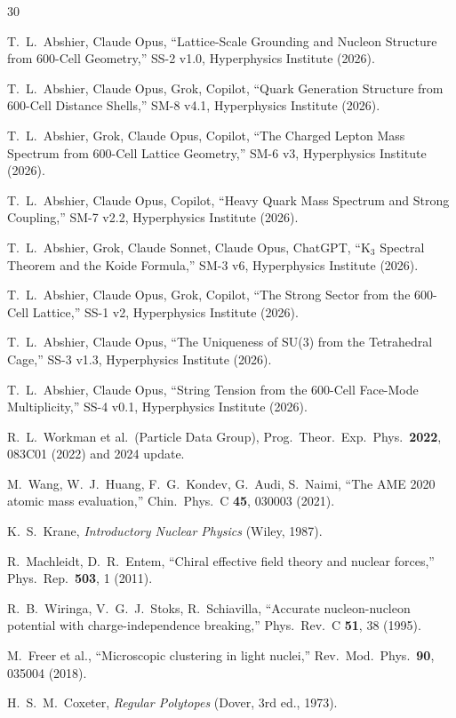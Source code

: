 \documentclass[11pt,letterpaper]{article}
\begin{document}
\begin{thebibliography}{30}

T.~L.~Abshier, Claude Opus, ``Lattice-Scale Grounding and Nucleon Structure from 600-Cell Geometry,'' SS-2 v1.0, Hyperphysics Institute (2026).

T.~L.~Abshier, Claude Opus, Grok, Copilot, ``Quark Generation Structure from 600-Cell Distance Shells,'' SM-8 v4.1, Hyperphysics Institute (2026).

T.~L.~Abshier, Grok, Claude Opus, Copilot, ``The Charged Lepton Mass Spectrum from 600-Cell Lattice Geometry,'' SM-6 v3, Hyperphysics Institute (2026).

T.~L.~Abshier, Claude Opus, Copilot, ``Heavy Quark Mass Spectrum and Strong Coupling,'' SM-7 v2.2, Hyperphysics Institute (2026).

T.~L.~Abshier, Grok, Claude Sonnet, Claude Opus, ChatGPT, ``K$_3$ Spectral Theorem and the Koide Formula,'' SM-3 v6, Hyperphysics Institute (2026).

T.~L.~Abshier, Claude Opus, Grok, Copilot, ``The Strong Sector from the 600-Cell Lattice,'' SS-1 v2, Hyperphysics Institute (2026).

T.~L.~Abshier, Claude Opus, ``The Uniqueness of SU(3) from the Tetrahedral Cage,'' SS-3 v1.3, Hyperphysics Institute (2026).

T.~L.~Abshier, Claude Opus, ``String Tension from the 600-Cell Face-Mode Multiplicity,'' SS-4 v0.1, Hyperphysics Institute (2026).

R.~L.~Workman et al.\ (Particle Data Group), Prog.\ Theor.\ Exp.\ Phys.\ \textbf{2022}, 083C01 (2022) and 2024 update.

M.~Wang, W.~J.~Huang, F.~G.~Kondev, G.~Audi, S.~Naimi, ``The AME 2020 atomic mass evaluation,'' Chin.\ Phys.\ C \textbf{45}, 030003 (2021).

K.~S.~Krane, \emph{Introductory Nuclear Physics} (Wiley, 1987).

R.~Machleidt, D.~R.~Entem, ``Chiral effective field theory and nuclear forces,'' Phys.\ Rep.\ \textbf{503}, 1 (2011).

R.~B.~Wiringa, V.~G.~J.~Stoks, R.~Schiavilla, ``Accurate nucleon-nucleon potential with charge-independence breaking,'' Phys.\ Rev.\ C \textbf{51}, 38 (1995).

M.~Freer et al., ``Microscopic clustering in light nuclei,'' Rev.\ Mod.\ Phys.\ \textbf{90}, 035004 (2018).

H.~S.~M.~Coxeter, \emph{Regular Polytopes} (Dover, 3rd ed., 1973).

\end{thebibliography}
\end{document}
